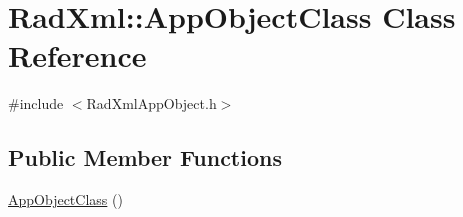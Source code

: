 \hypertarget{class_rad_xml_1_1_app_object_class}{\section{Rad\-Xml\-:\-:App\-Object\-Class Class Reference}
\label{class_rad_xml_1_1_app_object_class}
}


{\ttfamily \#include $<$Rad\-Xml\-App\-Object.\-h$>$}

\subsection*{Public Member Functions}
\begin{DoxyCompactItemize}
\item 
\hyperlink{class_rad_xml_1_1_app_object_class_a2e356b17b1c7937f57648a31cf997a42}{App\-Object\-Class} ()
\end{DoxyCompactItemize}
